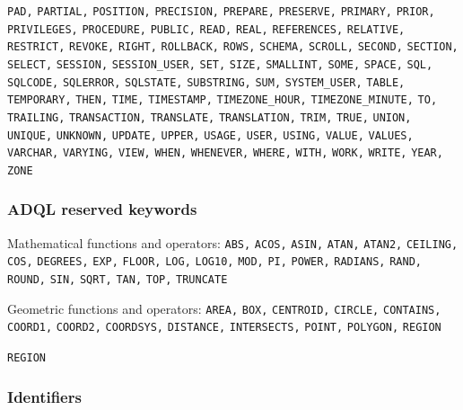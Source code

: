 \documentclass[11pt,a4paper]{ivoa}
\begin{document}
\texttt{PAD,} \texttt{PARTIAL,} \texttt{POSITION,} 
\texttt{PRECISION,} \texttt{PREPARE,} \texttt{PRESERVE,} 
\texttt{PRIMARY,} \texttt{PRIOR,} \texttt{PRIVILEGES,} 
\texttt{PROCEDURE,} \texttt{PUBLIC,} \texttt{READ,} \texttt{REAL,} 
\texttt{REFERENCES,} \texttt{RELATIVE,} \texttt{RESTRICT,} 
\texttt{REVOKE,} \texttt{RIGHT,} \texttt{ROLLBACK,} \texttt{ROWS,} 
\texttt{SCHEMA,} \texttt{SCROLL,} \texttt{SECOND,} \texttt{SECTION,} 
\texttt{SELECT,} \texttt{SESSION,} \texttt{SESSION\_USER,} 
\texttt{SET,} \texttt{SIZE,} \texttt{SMALLINT,} \texttt{SOME,} 
\texttt{SPACE,} \texttt{SQL,} \texttt{SQLCODE,} \texttt{SQLERROR,} 
\texttt{SQLSTATE,} \texttt{SUBSTRING,} \texttt{SUM,} 
\texttt{SYSTEM\_USER,} \texttt{TABLE,} \texttt{TEMPORARY,} 
\texttt{THEN,} \texttt{TIME,} \texttt{TIMESTAMP,} 
\texttt{TIMEZONE\_HOUR,} \texttt{TIMEZONE\_MINUTE,} \texttt{TO,} 
\texttt{TRAILING,} \texttt{TRANSACTION,} \texttt{TRANSLATE,} 
\texttt{TRANSLATION,} \texttt{TRIM,} \texttt{TRUE,} \texttt{UNION,} 
\texttt{UNIQUE,} \texttt{UNKNOWN,} \texttt{UPDATE,} \texttt{UPPER,} 
\texttt{USAGE,} \texttt{USER,} \texttt{USING,} \texttt{VALUE,} 
\texttt{VALUES,} \texttt{VARCHAR,} \texttt{VARYING,} \texttt{VIEW,} 
\texttt{WHEN,} \texttt{WHENEVER,} \texttt{WHERE,} \texttt{WITH,} 
\texttt{WORK,} \texttt{WRITE,} \texttt{YEAR,} \texttt{ZONE} 

\subsubsection{ADQL reserved keywords}
\label{sec:adql.reswords}

Mathematical functions and operators:
\noindent
\texttt{ABS,} \texttt{ACOS,} \texttt{ASIN,} \texttt{ATAN,} 
\texttt{ATAN2,} \texttt{CEILING,} \texttt{COS,} \texttt{DEGREES,} 
\texttt{EXP,} \texttt{FLOOR,} \texttt{LOG,} \texttt{LOG10,} 
\texttt{MOD,} \texttt{PI,} \texttt{POWER,} \texttt{RADIANS,} 
\texttt{RAND,} \texttt{ROUND,} \texttt{SIN,} \texttt{SQRT,} 
\texttt{TAN,} \texttt{TOP,} \texttt{TRUNCATE}
\newline
\newline

Geometric functions and operators:
\noindent
\texttt{AREA,} \texttt{BOX,} \texttt{CENTROID,} \texttt{CIRCLE,} 
\texttt{CONTAINS,} \texttt{COORD1,} \texttt{COORD2,} 
\texttt{COORDSYS,} \texttt{DISTANCE,} \texttt{INTERSECTS,} 
\texttt{POINT,} \texttt{POLYGON,} \texttt{REGION}

\noindent
\texttt{REGION}

\subsubsection{Identifiers}
\label{sec:adql.identifiers}
\end{document}
